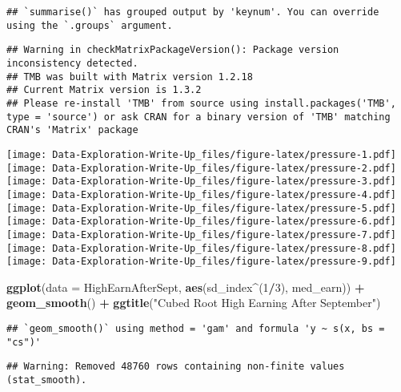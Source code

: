 \documentclass[
]{article}
\newenvironment{Shaded}{\begin{snugshade}}{\end{snugshade}}
\newcommand{\DataTypeTok}[1]{\textcolor[rgb]{0.13,0.29,0.53}{#1}}
\newcommand{\DecValTok}[1]{\textcolor[rgb]{0.00,0.00,0.81}{#1}}
\newcommand{\KeywordTok}[1]{\textcolor[rgb]{0.13,0.29,0.53}{\textbf{#1}}}
\newcommand{\NormalTok}[1]{#1}
\newcommand{\OperatorTok}[1]{\textcolor[rgb]{0.81,0.36,0.00}{\textbf{#1}}}
\newcommand{\StringTok}[1]{\textcolor[rgb]{0.31,0.60,0.02}{#1}}
\begin{document}
\begin{verbatim}
## `summarise()` has grouped output by 'keynum'. You can override using the `.groups` argument.
\end{verbatim}

\begin{verbatim}
## Warning in checkMatrixPackageVersion(): Package version inconsistency detected.
## TMB was built with Matrix version 1.2.18
## Current Matrix version is 1.3.2
## Please re-install 'TMB' from source using install.packages('TMB', type = 'source') or ask CRAN for a binary version of 'TMB' matching CRAN's 'Matrix' package
\end{verbatim}

\texttt{[image: Data-Exploration-Write-Up\_files/figure-latex/pressure-1.pdf]}
\texttt{[image: Data-Exploration-Write-Up\_files/figure-latex/pressure-2.pdf]}
\texttt{[image: Data-Exploration-Write-Up\_files/figure-latex/pressure-3.pdf]}
\texttt{[image: Data-Exploration-Write-Up\_files/figure-latex/pressure-4.pdf]}
\texttt{[image: Data-Exploration-Write-Up\_files/figure-latex/pressure-5.pdf]}
\texttt{[image: Data-Exploration-Write-Up\_files/figure-latex/pressure-6.pdf]}
\texttt{[image: Data-Exploration-Write-Up\_files/figure-latex/pressure-7.pdf]}
\texttt{[image: Data-Exploration-Write-Up\_files/figure-latex/pressure-8.pdf]}
\texttt{[image: Data-Exploration-Write-Up\_files/figure-latex/pressure-9.pdf]}

\begin{Shaded}
\begin{Highlighting}[]
\KeywordTok{ggplot}\NormalTok{(}\DataTypeTok{data =}\NormalTok{ HighEarnAfterSept, }\KeywordTok{aes}\NormalTok{(sd\_index}\OperatorTok{\^{}}\NormalTok{(}\DecValTok{1}\OperatorTok{/}\DecValTok{3}\NormalTok{), med\_earn)) }\OperatorTok{+}
\StringTok{  }\KeywordTok{geom\_smooth}\NormalTok{() }\OperatorTok{+}\StringTok{ }\KeywordTok{ggtitle}\NormalTok{(}\StringTok{"Cubed Root High Earning After September"}\NormalTok{)}
\end{Highlighting}
\end{Shaded}

\begin{verbatim}
## `geom_smooth()` using method = 'gam' and formula 'y ~ s(x, bs = "cs")'
\end{verbatim}

\begin{verbatim}
## Warning: Removed 48760 rows containing non-finite values (stat_smooth).
\end{verbatim}
\end{document}
